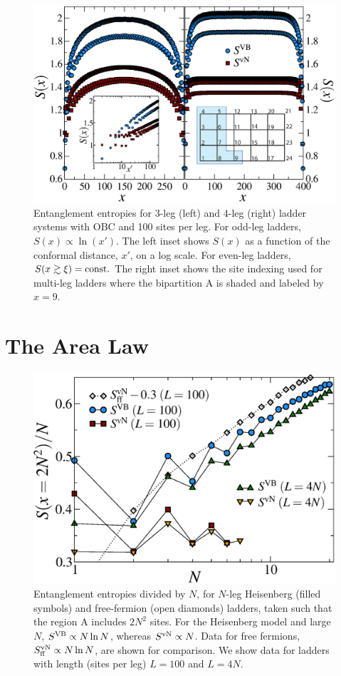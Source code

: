 \begin{figure} { \includegraphics[width=6.5in]{./figures/paper1/figure23new/fig23NEW.eps}
\caption[EEs for 3- \& 4-leg ladders]{
{\color{red}
Entanglement entropies for 3-leg (left)
and 4-leg (right) ladder systems with OBC and 100 sites per leg.  For
odd-leg ladders, $S(x)\propto\ln(x')$.  The left
inset shows $S(x)$ as a function of the conformal distance, $x'$, on a log
scale. For even-leg ladders, $S(x\gtrsim\xi)= {\rm const}.$
The right inset shows the site indexing used for multi-leg ladders where the
bipartition A is shaded and labeled by $x=9$. 
}
 \label{ladder} }} 
 \end{figure}

\section{The Area Law}

\begin{figure} { \includegraphics[width=6.5in]{./figures/paper1/figure4/fig4.eps}
 \caption[Area Law in 2D Heis model]{
 {\color{red} Entanglement entropies divided by $N$,  for $N$-leg Heisenberg
(filled symbols) and free-fermion (open diamonds) ladders, taken such that
the region A includes $2N^2$ sites.  
For the Heisenberg model and large $N$, $S^{\rm VB}\propto N \ln N$,
whereas $S^{\rm vN}\propto N$.  
Data for free fermions, $S^{\rm vN}_{\rm ff}\propto N \ln N$,  are shown for comparison.
We show data for ladders with length (sites per leg) $L =100$ and
$L=4N$.  
}
\label{zigzag}}} 
\end{figure}
